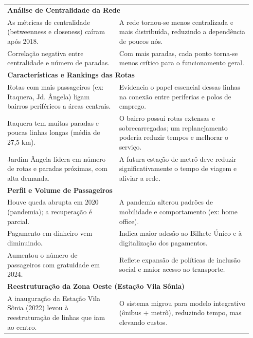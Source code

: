 \begin{longtable}[c]{
  p{}
  p{}
}
\midrule
\multicolumn{2}{l}{\textbf{Análise de Centralidade da Rede}} \\
As métricas de centralidade (betweenness e closeness) caíram após 2018. &
A rede tornou-se menos centralizada e mais distribuída, reduzindo a dependência de poucos nós. \\

Correlação negativa entre centralidade e número de paradas. &
Com mais paradas, cada ponto torna-se menos crítico para o funcionamento geral. \\

\midrule
\multicolumn{2}{l}{\textbf{Características e Rankings das Rotas}} \\
Rotas com mais passageiros (ex: Itaquera, Jd. Ângela) ligam bairros periféricos a áreas centrais. &
Evidencia o papel essencial dessas linhas na conexão entre periferias e polos de emprego. \\

Itaquera tem muitas paradas e poucas linhas longas (média de 27,5 km). &
O bairro possui rotas extensas e sobrecarregadas; um replanejamento poderia reduzir tempos e melhorar o serviço. \\

Jardim Ângela lidera em número de rotas e paradas próximas, com alta demanda. &
A futura estação de metrô deve reduzir significativamente o tempo de viagem e aliviar a rede. \\

\midrule
\multicolumn{2}{l}{\textbf{Perfil e Volume de Passageiros}} \\
Houve queda abrupta em 2020 (pandemia); a recuperação é parcial. &
A pandemia alterou padrões de mobilidade e comportamento (ex: home office). \\

Pagamento em dinheiro vem diminuindo. &
Indica maior adesão ao Bilhete Único e à digitalização dos pagamentos. \\

Aumentou o número de passageiros com gratuidade em 2024. &
Reflete expansão de políticas de inclusão social e maior acesso ao transporte. \\

\midrule
\multicolumn{2}{l}{\textbf{Reestruturação da Zona Oeste (Estação Vila Sônia)}} \\
\addlinespace[3pt]
A inauguração da Estação Vila Sônia (2022) levou à reestruturação de linhas que iam ao centro. &
O sistema migrou para modelo integrativo (ônibus + metrô), reduzindo tempo, mas elevando custos. \\


\end{longtable}
